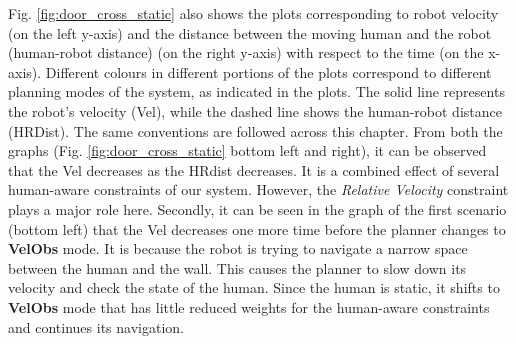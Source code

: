 Fig. \ref{fig:door_cross_static} also shows the plots corresponding to robot velocity (on the left y-axis) and the distance between the moving human and the robot (human-robot distance) (on the right y-axis) with respect to the time (on the x-axis). Different colours in different portions of the plots correspond to different planning modes of the system, as indicated in the plots. The solid line represents the robot's velocity (Vel), while the dashed line shows the human-robot distance (HRDist). The same conventions are followed across this chapter. From both the graphs (Fig. \ref{fig:door_cross_static} bottom left and right), it can be observed that the Vel decreases as the HRdist decreases. It is a combined effect of several human-aware constraints of our system. However, the \textit{Relative Velocity} constraint plays a major role here. Secondly, it can be seen in the graph of the first scenario (bottom left) that the Vel decreases one more time before the planner changes to \textbf{VelObs} mode. It is because the robot is trying to navigate a narrow space between the human and the wall. This causes the planner to slow down its velocity and check the state of the human. Since the human is static, it shifts to \textbf{VelObs} mode that has little reduced weights for the human-aware constraints and continues its navigation.

